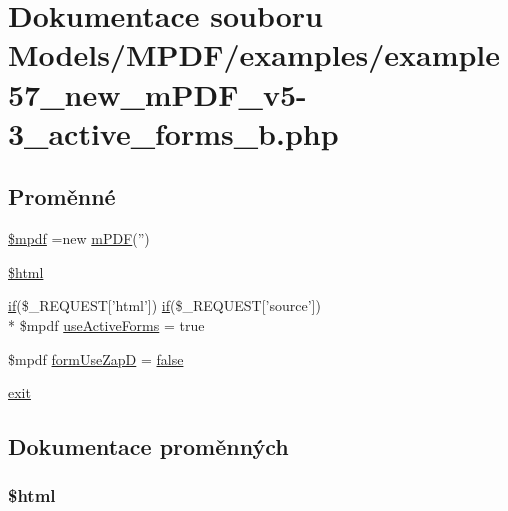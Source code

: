 \hypertarget{example57__new__m_p_d_f__v5-3__active__forms__b_8php}{\section{Dokumentace souboru Models/\-M\-P\-D\-F/examples/example57\-\_\-new\-\_\-m\-P\-D\-F\-\_\-v5-\/3\-\_\-active\-\_\-forms\-\_\-b.php}
\label{example57__new__m_p_d_f__v5-3__active__forms__b_8php}
}
\subsection*{Proměnné}
\begin{DoxyCompactItemize}
\item 
\hyperlink{example57__new__m_p_d_f__v5-3__active__forms__b_8php_ad028f81910d6cbab9b184d2214b3a8f8}{\$mpdf} =new \hyperlink{classm_p_d_f}{m\-P\-D\-F}('')
\item 
\hyperlink{example57__new__m_p_d_f__v5-3__active__forms__b_8php_a6f96e7fc92441776c9d1cd3386663b40}{\$html}
\item 
\hyperlink{pdf__parser_8php_af8105e84b42a9ceda5357caeb6c4760b}{if}(\$\-\_\-\-R\-E\-Q\-U\-E\-S\-T\mbox{[}'html'\mbox{]}) \hyperlink{pdf__parser_8php_af8105e84b42a9ceda5357caeb6c4760b}{if}(\$\-\_\-\-R\-E\-Q\-U\-E\-S\-T\mbox{[}'source'\mbox{]}) \\*
\$mpdf \hyperlink{example57__new__m_p_d_f__v5-3__active__forms__b_8php_a378161bd0fa26b3dc46a75ac7aa2671b}{use\-Active\-Forms} = true
\item 
\$mpdf \hyperlink{example57__new__m_p_d_f__v5-3__active__forms__b_8php_a998ef53c860d28ac05e36c6c6d80a3ee}{form\-Use\-Zap\-D} = \hyperlink{ttfontsuni_8php_afbaa04e5cc97693dc668b3c45d3dd740}{false}
\item 
\hyperlink{example57__new__m_p_d_f__v5-3__active__forms__b_8php_a6733eb5f605d09eaede9845835d71c4e}{exit}
\end{DoxyCompactItemize}


\subsection{Dokumentace proměnných}
\hypertarget{example57__new__m_p_d_f__v5-3__active__forms__b_8php_a6f96e7fc92441776c9d1cd3386663b40}{
\subsubsection[{\$html}]{\setlength{\rightskip}{0pt plus 5cm}\$html}}\label{example57__new__m_p_d_f__v5-3__active__forms__b_8php_a6f96e7fc92441776c9d1cd3386663b40}


